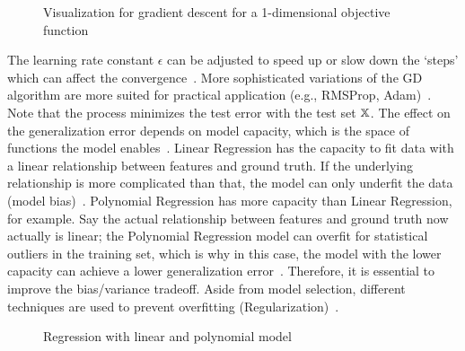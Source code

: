 \begin{figure}[hb]
    \centering
    
    \caption[Gradient descent visualization]{%
        Visualization for gradient descent for
        a 1-dimensional objective function~\citep{goodfellow_deep_2016}\label{fig:grad-desc}
    }
\end{figure}
The learning rate constant $\epsilon$ can be adjusted to speed up or slow down the `steps' which
can affect the convergence~\citep{goodfellow_deep_2016}.
More sophisticated variations of the \ac{GD} algorithm are more suited for practical
application (e.g., RMSProp, Adam)~\citep{geron_hands-machine_2017}.
Note that the process minimizes the test error with the test set $\mathbb{X}$.
The effect on the generalization error depends on model capacity, which is the space of functions
the model enables~\citep{goodfellow_deep_2016}.
Linear Regression has the capacity to fit data with a linear relationship between features and
ground truth.
If the underlying relationship is more complicated than that, the model can only underfit the data
(model bias)~\citep{goodfellow_deep_2016}.
Polynomial Regression has more capacity than Linear Regression, for example.
Say the actual relationship between features and ground truth now actually is linear;
the Polynomial Regression model can overfit for statistical outliers in the training set, which is why
in this case, the model with the lower capacity can achieve a lower generalization
error~\citep{geron_hands-machine_2017}.
Therefore, it is essential to improve the bias/variance tradeoff.
Aside from model selection, different techniques are used to prevent overfitting
(Regularization)~\citep{goodfellow_deep_2016}.
\begin{figure}[h]
    \centering
    \caption[Regression over- and underfitting]{%
        Regression with linear and polynomial model\label{fig:examples}
    }
\end{figure}

